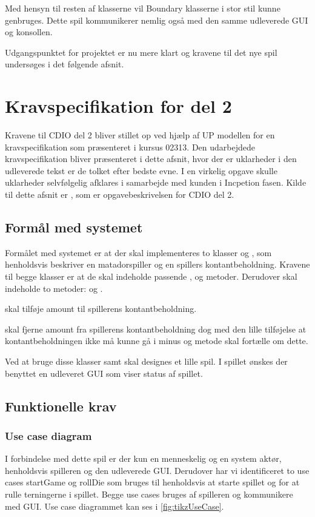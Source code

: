 Med hensyn til resten af klasserne vil Boundary klasserne i stor stil kunne genbruges. Dette spil kommunikerer nemlig også med den samme udleverede GUI og konsollen.

Udgangspunktet for projektet er nu mere klart og kravene til det nye spil undersøges i det følgende afsnit.

\section{Kravspecifikation for del 2}\label{sec:krav:kravSpec}
Kravene til CDIO del 2 bliver stillet op ved hjælp af UP modellen for en kravspecifikation som præsenteret i kursus 02313. Den udarbejdede kravspecifikation bliver præsenteret i dette afsnit, hvor der er uklarheder i den udleverede tekst er de tolket efter bedste evne. I en virkelig opgave skulle uklarheder selvfølgelig afklares i samarbejde med kunden i Incpetion fasen. Kilde til dette afsnit er \cite{CDIOdel2}, som er opgavebeskrivelsen for CDIO del 2.

\subsection{Formål med systemet}\label{sec:krav:kravSpec:formaal}
Formålet med systemet er at der skal implementeres to klasser  og , som henholdsvis beskriver en matadorspiller og en spillers kontantbeholdning. Kravene til begge klasser er at de skal indeholde passende ,  og  metoder. Derudover skal  indeholde to metoder:  og .

 skal tilføje amount til spillerens kontantbeholdning.

 skal fjerne amount fra spillerens kontantbeholdning dog med den lille tilføjelse at kontantbeholdningen ikke må kunne gå i minus og metode skal fortælle om dette.

Ved at bruge disse klasser samt  skal designes et lille spil. I spillet ønskes der benyttet en udleveret GUI som viser status af spillet.

\subsection{Funktionelle krav}\label{sec:krav:kravSpec:funkKrav}

\subsubsection{Use case diagram}
I forbindelse med dette spil er der kun en menneskelig og en system aktør, henholdsvis spilleren og den udleverede GUI. Derudover har vi identificeret to use cases startGame og rollDie som bruges til henholdsvis at starte spillet og for at rulle terningerne i spillet. Begge use cases bruges af spilleren og kommunikere med GUI. Use case diagrammet kan ses i \vref{fig:tikzUseCase}.

